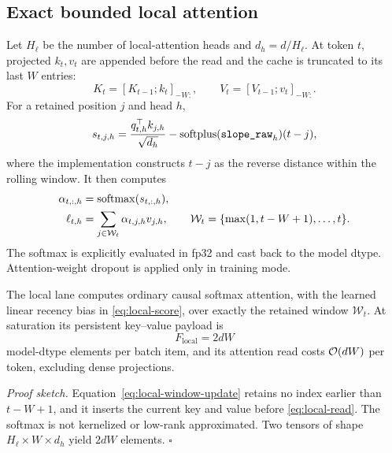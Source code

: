 \subsection{Exact bounded local attention}
\label{subsec:local-attention}

Let \(H_\ell\) be the number of local-attention heads and
\(d_h=d/H_\ell\).  At token \(t\), projected \(k_t,v_t\) are appended before
the read and the cache is truncated to its last \(W\) entries:
\begin{equation}
  K_t=[K_{t-1};k_t]_{-W:},
  \qquad
  V_t=[V_{t-1};v_t]_{-W:}.
  \label{eq:local-window-update}
\end{equation}
For a retained position \(j\) and head \(h\),
\begin{equation}
  s_{t,j,h}
  =
  \frac{q_{t,h}^{\top}k_{j,h}}{\sqrt{d_h}}
  -
  \operatorname{softplus}(\texttt{slope\_raw}_h)(t-j),
  \label{eq:local-score}
\end{equation}
where the implementation constructs \(t-j\) as the reverse distance within
the rolling window.  It then computes
\begin{align}
  \alpha_{t,:,h}
    &=\operatorname{softmax}(s_{t,:,h}), \\
  \ell_{t,h}
    &=\sum_{j\in\mathcal W_t}\alpha_{t,j,h}v_{j,h},
  \qquad
  \mathcal W_t=\{\max(1,t-W+1),\ldots,t\}.
  \label{eq:local-read}
\end{align}
The softmax is explicitly evaluated in fp32 and cast back to the model dtype.
Attention-weight dropout is applied only in training mode.

\begin{proposition}
\label{prop:local-exactness}
The local lane computes ordinary causal softmax attention, with the learned
linear recency bias in \eqref{eq:local-score}, over exactly the retained
window \(\mathcal W_t\).  At saturation its persistent key--value payload is
\begin{equation}
  F_{\mathrm{local}}=2dW
  \label{eq:local-state-elements}
\end{equation}
model-dtype elements per batch item, and its attention read costs
\(\mathcal{O}(dW)\) per token, excluding dense projections.
\end{proposition}
\noindent\emph{Proof sketch.}
Equation~\eqref{eq:local-window-update} retains no index earlier than
\(t-W+1\), and it inserts the current key and value before
\eqref{eq:local-read}.  The softmax is not kernelized or low-rank
approximated.  Two tensors of shape \(H_\ell\times W\times d_h\) yield
\(2dW\) elements. \hfill\(\square\)

